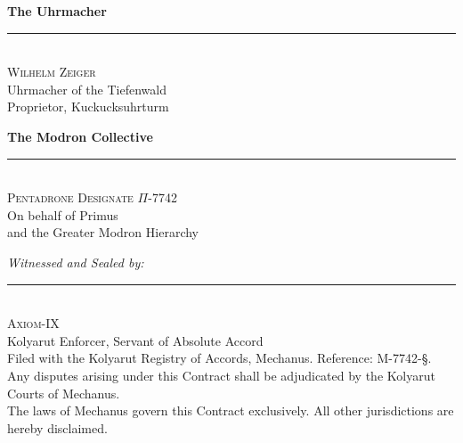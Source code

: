 \documentclass[12pt]{article}
\renewcommand{\footnotesize}{\fontsize{7}{8}\selectfont}
\begin{document}
\vspace{24pt}

\begin{minipage}[t]{0.45\textwidth}
\centering
\textbf{The Uhrmacher}\\[30pt]
\rule{0.8\textwidth}{0.4pt}\\[4pt]
\textsc{Wilhelm Zeiger}\\
{\small Uhrmacher of the Tiefenwald\\
Proprietor, Kuckucksuhrturm}
\end{minipage}
\hfill
\begin{minipage}[t]{0.45\textwidth}
\centering
\textbf{The Modron Collective}\\[30pt]
\rule{0.8\textwidth}{0.4pt}\\[4pt]
\textsc{Pentadrone Designate $\Pi$-7742}\\
{\small On behalf of Primus\\
and the Greater Modron Hierarchy}
\end{minipage}

\vspace{24pt}

\begin{center}
\textit{Witnessed and Sealed by:}\\[20pt]
\rule{0.4\textwidth}{0.4pt}\\[4pt]
\textsc{Axiom-IX}\\
{\small Kolyarut Enforcer, Servant of Absolute Accord}\\[6pt]
{\footnotesize Filed with the Kolyarut Registry of Accords,
Mechanus. Reference: M-7742-\S.\\
Any disputes arising under this Contract shall be adjudicated by the
Kolyarut Courts of Mechanus.\\
The laws of Mechanus govern this Contract exclusively.
All other jurisdictions are hereby disclaimed.}
\end{center}
\end{document}
